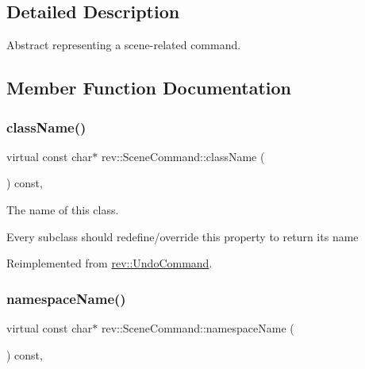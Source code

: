 \subsection{Detailed Description}
Abstract representing a scene-\/related command. 

\subsection{Member Function Documentation}
\mbox{\label{classrev_1_1_scene_command_a9b9126f306b1775c4f74ffb8b1a49dc5}} 
\subsubsection{\texorpdfstring{className()}{className()}}
{\footnotesize\ttfamily virtual const char$\ast$ rev\+::\+Scene\+Command\+::class\+Name (\begin{DoxyParamCaption}{ }\end{DoxyParamCaption}) const\hspace{0.3cm}{\ttfamily [inline]}, {\ttfamily [virtual]}}



The name of this class. 

Every subclass should redefine/override this property to return its name 

Reimplemented from \mbox{\hyperlink{classrev_1_1_undo_command_ab30f020732532e7cfd5472bdee65dcdb}{rev\+::\+Undo\+Command}}.

\mbox{\label{classrev_1_1_scene_command_a8914ef927fc5bcf9071ab857c4c636a4}} 
\subsubsection{\texorpdfstring{namespaceName()}{namespaceName()}}
{\footnotesize\ttfamily virtual const char$\ast$ rev\+::\+Scene\+Command\+::namespace\+Name (\begin{DoxyParamCaption}{ }\end{DoxyParamCaption}) const\hspace{0.3cm}{\ttfamily [inline]}, {\ttfamily [virtual]}}



